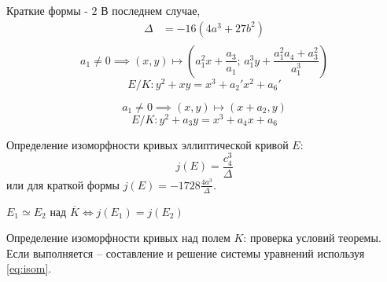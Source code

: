 \documentclass{beamer}
\begin{document}
\begin{frame}{Краткие формы - $2$}
В последнем случае, 
\begin{align*}
    \Delta &= -16(4a^3 + 27b^2) \\ \nonumber
\end{align*}
\[
a_1 \neq 0 \implies (x, y) \mapsto \left(a_1^2x+\frac{a_3}{a_1}; \, a_1^3y + \frac{a_1^2a_4+a_3^2}{a_1^3}\right)
\]
\begin{equation}
    E/K: y^2+xy=x^3+a_2'x^2+a_6'
\end{equation}

\[
a_1 \neq 0 \implies (x, y) \mapsto (x+a_2, y)
\]
\begin{equation}
    E/K: y^2+a_3y = x^3+a_4x+a_6
\end{equation}
\end{frame}

\begin{frame}{Определение изоморфности кривых}
 эллиптической кривой $E$:
\[
j(E) = \frac{c_4^3}{\Delta}
\] или для краткой формы  $j(E) = -1728 \frac{4a^3}{\Delta}$.
\begin{center}
    \begin{tcolorbox}[enhanced,hbox,colback=title-and-section-color!5,colframe=title-and-section-color!120,title=Теорема,center title]
        \begin{varwidth}{\textwidth}
            \begin{center}
                $E_1 \simeq E_2$ над $\overline{K} \iff j(E_1)=j(E_2)$
            \end{center}
        \end{varwidth}
    \end{tcolorbox}	
\end{center}
Определение изоморфности кривых над полем $K$: проверка условий теоремы. Если выполняется -- составление и решение системы уравнений используя \eqref{eq:isom}.
\end{frame}
\end{document}
